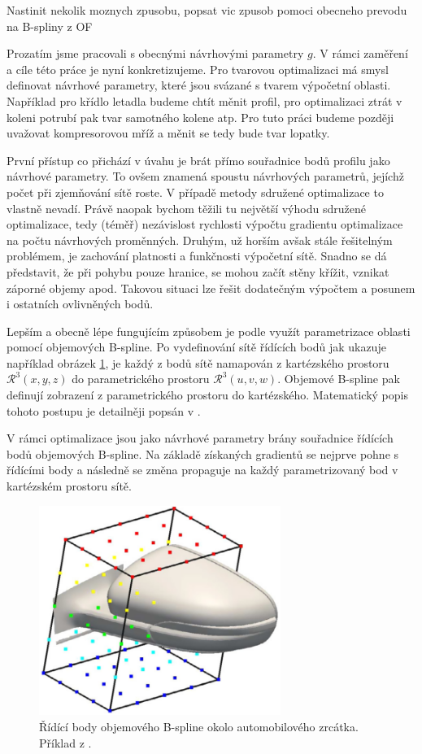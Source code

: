 Nastinit nekolik moznych zpusobu, popsat vic zpusob pomoci obecneho prevodu na B-spliny z OF

Prozatím jsme pracovali s obecnými návrhovými parametry $ g $. V rámci zaměření a cíle této práce je nyní konkretizujeme. Pro tvarovou optimalizaci má smysl definovat návrhové parametry, které jsou svázané s tvarem výpočetní oblasti. Například pro křídlo letadla budeme chtít měnit profil, pro optimalizaci ztrát v koleni potrubí pak tvar samotného kolene atp. Pro tuto práci budeme později uvažovat kompresorovou mříž a měnit se tedy bude tvar lopatky.

První přístup co přichází v úvahu je brát přímo souřadnice bodů profilu jako návrhové parametry. To ovšem znamená spoustu návrhových parametrů, jejíchž počet při zjemňování sítě roste. V případě metody sdružené optimalizace to vlastně nevadí. Právě naopak bychom těžili tu největší výhodu sdružené optimalizace, tedy (téměř) nezávislost rychlosti výpočtu gradientu optimalizace na počtu návrhových proměnných. Druhým, už horším avšak stále řešitelným problémem, je zachování platnosti a funkčnosti výpočetní sítě. Snadno se dá představit, že při pohybu pouze hranice, se mohou začít stěny křížit, vznikat záporné objemy apod. Takovou situaci lze řešit dodatečným výpočtem a posunem i ostatních ovlivněných bodů. 

Lepším a obecně lépe fungujícím způsobem je podle \cite{adjoint2020foam} využít parametrizace oblasti pomocí objemových B-spline.
Po vydefinování sítě řídících bodů jak ukazuje například obrázek \ref{fig:zrcatko}, je každý z bodů sítě namapován z kartézského prostoru $ \mathcal{R}^3(x,y,z) $ do parametrického prostoru $ \mathcal{R}^3(u,v,w) $.
Objemové B-spline pak definují zobrazení z parametrického prostoru do kartézského. 
Matematický popis tohoto postupu je detailněji popsán v \cite{papoutsis2015noise}. 

V rámci optimalizace jsou jako návrhové parametry brány souřadnice řídících bodů objemových B-spline. Na základě získaných gradientů se nejprve pohne s řídícími body a následně se změna propaguje na každý parametrizovaný bod v kartézském prostoru sítě.

\begin{figure}
	\includegraphics[width=0.7\textwidth]{./img/ridici_body.png}
	\caption{Řídící body objemového B-spline okolo automobilového zrcátka. Příklad z \cite{papoutsis2015noise}.}
	\label{fig:zrcatko}
\end{figure}


